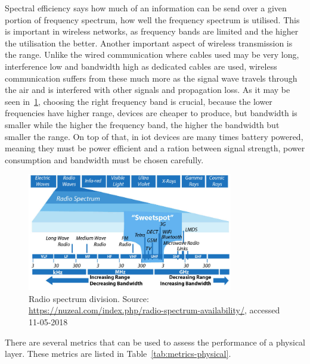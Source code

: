Spectral efficiency says how much of an information can be send over a given portion of frequency spectrum, how well the frequency spectrum is utilised. This is important in wireless networks, as frequency bands are limited and the higher the utilisation the better. Another important aspect of wireless transmission is the range. Unlike the wired communication where cables used may be very long, interference low and bandwidth high as dedicated cables are used, wireless communication suffers from these much more as the signal wave travels through the air and is interfered with other signals and propagation loss. As it may be seen in~\ref{fig:radio-spectrum}, choosing the right frequency band is crucial, because the lower frequencies have higher range, devices are cheaper to produce, but bandwidth is smaller while the higher the frequency band, the higher the bandwidth but smaller the range. On top of that, in \acrshort{iot} devices are many times battery powered, meaning they must be power efficient and a ration between signal strength, power consumption and bandwidth must be chosen carefully.

\begin{figure}
    \centering
    \includegraphics[width=0.8\textwidth]{00images/radio-spectrum-3}
    \caption{Radio spectrum division. Source: \url{https://nuzeal.com/index.php/radio-spectrum-availability/}, accessed 11-05-2018}
    \label{fig:radio-spectrum}
\end{figure}{}

There are several metrics that can be used to assess the performance of a physical layer. These metrics are listed in Table~\ref{tab:metrics-physical}.

